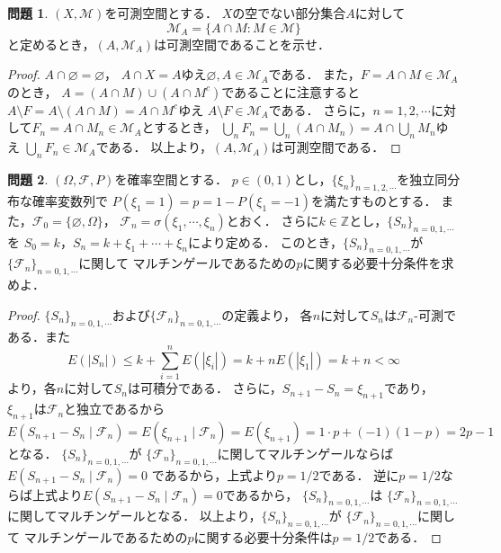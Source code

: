 \documentclass{jsarticle}
\theoremstyle{definition}
\newtheorem{qst}{問題}
\begin{document}
\begin{qst}
$(X,\mathcal{M})$を可測空間とする．
$X$の空でない部分集合$A$に対して
\[ \mathcal{M}_A=\{A\cap M:M\in\mathcal{M}\} \]
と定めるとき，$(A,\mathcal{M}_A)$は可測空間であることを示せ．
\end{qst}
\begin{proof}
$A\cap\varnothing=\varnothing$，
$A\cap X=A$ゆえ$\varnothing,A\in\mathcal{M}_A$である．
また，$F=A\cap M\in\mathcal{M}_A$のとき，
$A=(A\cap M)\cup(A\cap M^c)$であることに注意すると
$A\setminus F=A\setminus(A\cap M)=A\cap M^c$ゆえ
$A\setminus F\in\mathcal{M}_A$である．
さらに，$n=1,2,\cdots$に対して$F_n=A\cap M_n\in\mathcal{M}_A$とするとき，
$\bigcup_nF_n=\bigcup_n(A\cap M_n)=A\cap\bigcup_nM_n$ゆえ
$\bigcup_nF_n\in\mathcal{M}_A$である．
以上より，$(A,\mathcal{M}_A)$は可測空間である．
\end{proof}

\begin{qst}
$(\Omega,\mathcal{F},P)$を確率空間とする．
$p\in(0,1)$とし，$\{\xi_n\}_{n=1,2,\cdots}$を独立同分布な確率変数列で
$P(\xi_1=1)=p=1-P(\xi_1=-1)$を満たすものとする．
また，$\mathcal{F}_0=\{\varnothing,\Omega\}$，
$\mathcal{F}_n=\sigma(\xi_1,\cdots,\xi_n)$とおく．
さらに$k\in\mathbb{Z}$とし，$\{S_n\}_{n=0,1,\cdots}$を
$S_0=k$，$S_n=k+\xi_1+\cdots+\xi_n$により定める．
このとき，$\{S_n\}_{n=0,1,\cdots}$が
$\{\mathcal{F}_n\}_{n=0,1,\cdots}$に関して
マルチンゲールであるための$p$に関する必要十分条件を求めよ．
\end{qst}
\begin{proof}
$\{S_n\}_{n=0,1,\cdots}$および$\{\mathcal{F}_n\}_{n=0,1,\cdots}$の定義より，
各$n$に対して$S_n$は$\mathcal{F}_n$-可測である．また
\[ E(|S_n|)\leq k+\sum_{i=1}^nE(|\xi_i|)
=k+nE(|\xi_1|)=k+n<\infty \]
より，各$n$に対して$S_n$は可積分である．
さらに，$S_{n+1}-S_n=\xi_{n+1}$であり，
$\xi_{n+1}$は$\mathcal{F}_n$と独立であるから
\[ E(S_{n+1}-S_n\mid\mathcal{F}_n)=
E(\xi_{n+1}\mid\mathcal{F}_n)=E(\xi_{n+1})
=1\cdot p+(-1)(1-p)=2p-1 \]
となる．
$\{S_n\}_{n=0,1,\cdots}$が
$\{\mathcal{F}_n\}_{n=0,1,\cdots}$に関してマルチンゲールならば
$E(S_{n+1}-S_n\mid\mathcal{F}_n)=0$
であるから，上式より$p=1/2$である．
逆に$p=1/2$ならば上式より$E(S_{n+1}-S_n\mid\mathcal{F}_n)=0$であるから，
$\{S_n\}_{n=0,1,\cdots}$は
$\{\mathcal{F}_n\}_{n=0,1,\cdots}$に関してマルチンゲールとなる．
以上より，$\{S_n\}_{n=0,1,\cdots}$が
$\{\mathcal{F}_n\}_{n=0,1,\cdots}$に関して
マルチンゲールであるための$p$に関する必要十分条件は$p=1/2$である．
\end{proof}
\end{document}
